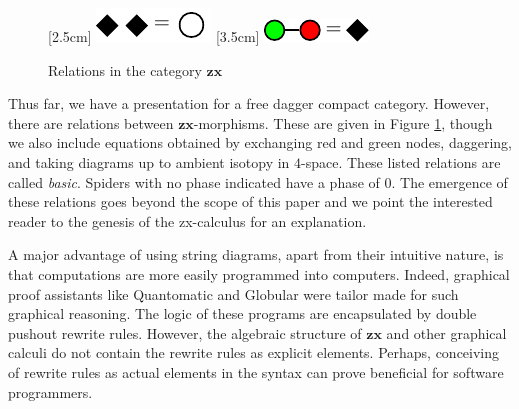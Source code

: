 \begin{figure}
{\begin{minipage}{\textwidth}
{			}
			\quad \quad \quad \quad \quad \quad 
			\vspace{1em} 
			\linebreak
			[2.5cm]{%
				\centering
				\includegraphics{InclGrphx--equation--loop}
			}
			[3.5cm]{%
				\centering
				\includegraphics{InclGrphx--equation--diamond}
			}
		\end{minipage}
	}
	\caption{Relations in the category $\mathbf{zx}$}
	\label{fig:ZX_equations}
\end{figure}

Thus far, we have a 
presentation for a 
free dagger compact category. 
However, there are relations 
between $\mathbf{zx}$-morphisms.
These are given in Figure \ref{fig:ZX_equations},  
though we also include equations obtained by 
exchanging red and green nodes, 
daggering, and 
taking diagrams up to 
ambient isotopy in $4$-space. 
These listed relations are called \emph{basic}.  
Spiders with no phase indicated 
have a phase of $0$. 
The emergence of these relations 
goes beyond the scope of this paper
and we point the interested reader to
the genesis of the zx-calculus 
	\cite{CoeckeDuncan_QuantumObsFullPaper}
for an explanation.

A major advantage 
of using string diagrams, 
apart from their intuitive nature, 
is that computations are 
more easily programmed into 
computers.  
Indeed, graphical proof assistants
like Quantomatic 
	\cite{BarKissingerVicary_Globular,
		DixonDuncanKissinger_QuantomaticWebsite} 
and Globular 
	\cite{BarKissingerVicary_Globular} 
were tailor made for such 
graphical reasoning.  
The logic of these programs are 
encapsulated by 
double pushout rewrite rules.  
However, 
the algebraic structure of $\mathbf{zx}$ 
and other graphical calculi 
do not contain the rewrite rules 
as explicit elements.  
Perhaps, 
conceiving of rewrite rules 
as actual elements
in the syntax can prove
beneficial for software programmers.
